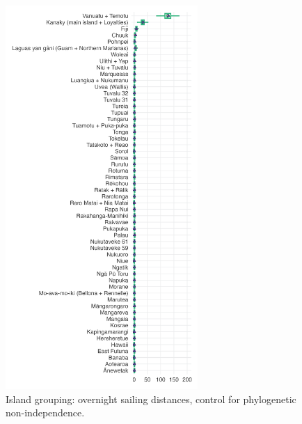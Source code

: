 \documentclass[unnumsec,webpdf,modern,medium]{oup-authoring-template}
\begin{document}
\begin{figure}[ht]
\includegraphics[width=0.65\textwidth]{brms_predict_SBZR_control_phylo.png}
\caption{Island grouping: overnight sailing distances, control for phylogenetic non-independence.}
\label{brms_predict_SBZR_control_phylo}
\end{figure}
\end{document}
